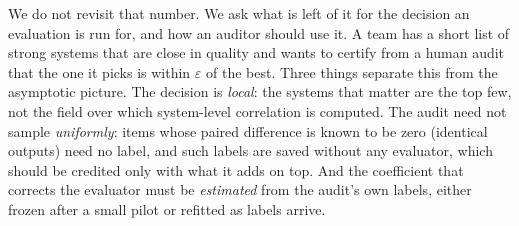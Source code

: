 \documentclass[11pt]{article}
\newcommand{\eps}{\varepsilon}
\begin{document}
We do not revisit that number. We ask what is left of it for the decision an evaluation is run for, and how an auditor
should use it. A team has a short list of strong systems that are close in quality and wants to certify from a human
audit that the one it picks is within $\eps$ of the best. Three things separate this from the asymptotic picture.
The decision is \emph{local}: the systems that matter are the top few, not the field over which system-level
correlation is computed. The audit need not sample \emph{uniformly}: items whose paired difference is known to be zero
(identical outputs) need no label, and such labels are saved without any evaluator, which should be credited only with
what it adds on top. And the coefficient that corrects the evaluator must be \emph{estimated} from the audit's own
labels, either frozen after a small pilot or refitted as labels arrive.
\end{document}
